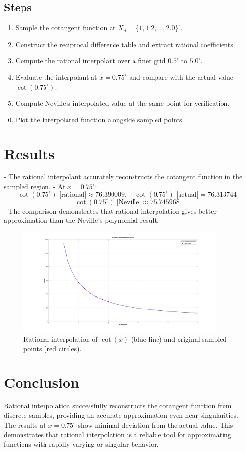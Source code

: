 \subsection*{Steps}
\begin{enumerate}
    \item Sample the cotangent function at \(X_d = \{1, 1.2, \dots, 2.0\}^\circ\).
    \item Construct the reciprocal difference table and extract rational coefficients.
    \item Compute the rational interpolant over a finer grid \(0.5^\circ\) to \(5.0^\circ\).
    \item Evaluate the interpolant at \(x = 0.75^\circ\) and compare with the actual value \(\cot(0.75^\circ)\).
    \item Compute Neville’s interpolated value at the same point for verification.
    \item Plot the interpolated function alongside sampled points.
\end{enumerate}

\section*{Results}
- The rational interpolant accurately reconstructs the cotangent function in the sampled region.
- At \(x = 0.75^\circ\):
\[
\cot(0.75^\circ) \text{ [rational]} \approx 76.390009, \quad \cot(0.75^\circ) \text{ [actual]} = 76.313744
\]
\[
\cot(0.75^\circ) \text{ [Neville]} \approx 75.745968
\]
- The comparison demonstrates that rational interpolation gives better approximation than the Neville’s polynomial result.

\begin{figure}[h!]
  \centering
  \includegraphics[width=0.93\textwidth]{a1.jpg}
  \caption{Rational interpolation of \(\cot(x)\) (blue line) and original sampled points (red circles).}
\end{figure}

\section*{Conclusion}
Rational interpolation successfully reconstructs the cotangent function from discrete samples, providing an accurate approximation even near singularities. The results at \(x=0.75^\circ\) show minimal deviation from the actual value. This demonstrates that rational interpolation is a reliable tool for approximating functions with rapidly varying or singular behavior.
